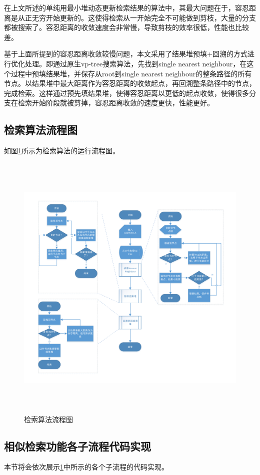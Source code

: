 在上文所述的单纯用最小堆动态更新检索结果的算法中，其最大问题在于，容忍距离是从正无穷开始更新的。这使得检索从一开始完全不可能做到剪枝，大量的分支都被搜索了。容忍距离的收敛速度会非常慢，导致剪枝的效率很低，性能也比较差。

基于上面所提到的容忍距离收敛较慢问题，本文采用了结果堆预填+回溯的方式进行优化处理。即通过原生vp-tree搜索算法，先找到single nearest neighbour，在这个过程中预填结果堆，并保存从root到single nearest neighbour的整条路径的所有节点。以结果堆中最大距离作为容忍距离的收敛起点，再回溯整条路径中的节点，完成检索。这样通过预先填结果堆，使得容忍距离以更低的起点收敛，使得很多分支在检索开始阶段就被剪掉，容忍距离收敛的速度更快，性能更好。
\subsection{检索算法流程图}
如图\ref{search-flow}所示为检索算法的运行流程图。
\begin{figure}[H]
  \centering
  \includegraphics[width=6in,height=5.2in]{new_FIGs/chapter4/search-flow.pdf}
  \caption{检索算法流程图}\label{search-flow}
\end{figure}

\subsection{相似检索功能各子流程代码实现}
本节将会依次展示\ref{search-flow}中所示的各个子流程的代码实现。

